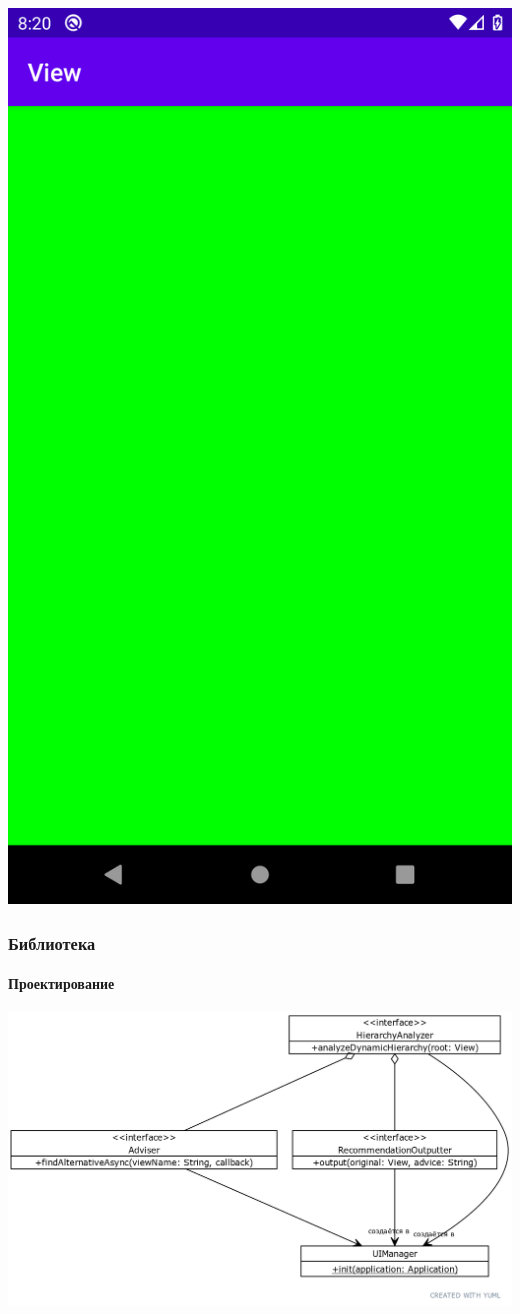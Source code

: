 \documentclass{beamer}
\begin{document}
\begin{frame}
\begin{multicols}{2}
            \columnbreak
            \centering
            \includegraphics[width=0.75\linewidth]{view}
        \end{multicols}
    \end{frame}
    \begin{frame}
        \frametitle{Библиотека}
        \framesubtitle{Проектирование}
        \includegraphics[width=\linewidth]{uml_interfaces}
    \end{frame}
\end{document}

